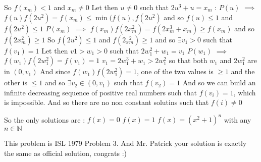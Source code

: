 \begin{solution}
So $f(x_m)<1$ and $x_m\ne 0$
Let then $u\ne 0$ such that $2u^3+u=x_m$ : $P(u)$ $\implies$ $f(u)f(2u^2)=f(x_m)\le\min(f(u),f(2u^2)$ and so $f(u)\le 1$ and $f(2u^2)\le 1$
$P(x_m)$ $\implies$ $f(x_m)f(2x_m^2)=f(2x_m^3+x_m)\ge f(x_m)$ and so $f(2x_m^2)\ge 1$
So $f(2u^2)\le 1$ and $f(2{}_x{}_m^2)\ge 1$ and so $\exists v_1>0$ such that $f(v_1)=1$
Let then $v1> w_1>0$ such that $2w_1^2+w_1=v_1$
$P(w_1)$ $\implies$ $f(w_1)f(2w_1^2)=f(v_1)=1$ 
$v_1=2w_1^3+w_1>2w_1^2$ so that both $w_1$ and $2w_1^2$ are in $(0,v_1)$
And since $f(w_1)f(2w_1^2)=1$, one of the two values is $\ge 1$ and the other is $\le 1$ and so $\exists v_2\in(0,v_1)$ such that $f(v_2)=1$
And so we can build an infinite decreasing sequence of positive real numbers such that $f(v_i)=1$, which is impossible.
And so there are no non constant solutins such that $f(i)\ne 0$

So the only solutions are :
$f(x)=0$
$f(x)=1$
$f(x)=(x^2+1)^n$ with any $n\in\mathbb N$
\end{solution}



\begin{solution}
	This problem is ISL 1979 Problem 3.
And Mr. Patrick your solution is exactly the same as official solution, congrats :)
\end{solution}



